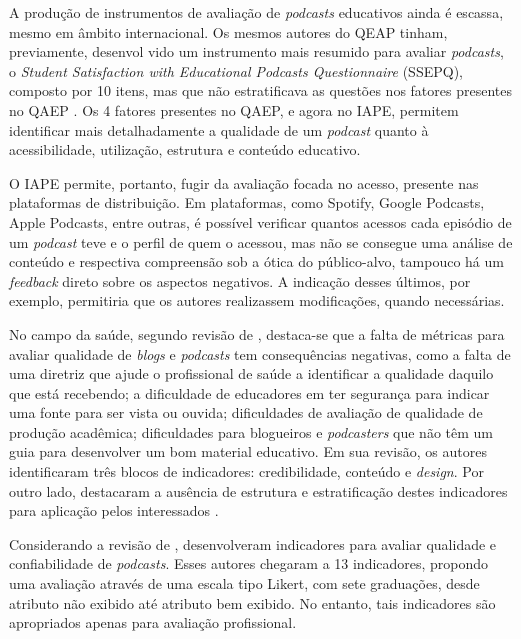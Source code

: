 A produção de instrumentos de avaliação de \textit{podcasts} educativos ainda é escassa, mesmo em âmbito internacional. Os mesmos autores do QEAP \cite{alarcon2020} tinham, previamente, desenvol vido um instrumento mais resumido para avaliar \textit{podcasts}, o \textit{Student Satisfaction with Educational Podcasts Questionnaire} (SSEPQ), composto por 10 itens, mas que não estratificava as questões nos fatores presentes no QAEP \cite{alarcon2017}. Os 4 fatores presentes no QAEP, e agora no IAPE, permitem identificar mais detalhadamente a qualidade de um \textit{podcast} quanto à acessibilidade, utilização, estrutura e conteúdo educativo.

O IAPE permite, portanto, fugir da avaliação focada no acesso, presente nas
plataformas de distribuição. Em plataformas, como Spotify, Google Podcasts,
Apple Podcasts, entre outras, é possível verificar quantos acessos cada
episódio de um \textit{podcast} teve e o perfil de quem o acessou, mas não se
consegue uma análise de conteúdo e respectiva compreensão sob a ótica do
público-alvo, tampouco há um \textit{feedback} direto sobre os aspectos
negativos. A indicação desses últimos, por exemplo, permitiria que os autores
realizassem modificações, quando necessárias.

No campo da saúde, segundo revisão de \textcite{paterson2015}, destaca-se que a
falta de métricas para avaliar qualidade de \textit{blogs} e \textit{podcasts}
tem consequências negativas, como a falta de uma diretriz que ajude o
profissional de saúde a identificar a qualidade daquilo que está recebendo; a
dificuldade de educadores em ter segurança para indicar uma fonte para ser
vista ou ouvida; dificuldades de avaliação de qualidade de produção acadêmica;
dificuldades para blogueiros e \textit{podcasters} que não têm um guia para
desenvolver um bom material educativo. Em sua revisão, os autores identificaram
três blocos de indicadores: credibilidade, conteúdo e \textit{design}. Por
outro lado, destacaram a ausência de estrutura e estratificação destes
indicadores para aplicação pelos interessados \cite{paterson2015}.

Considerando a revisão de \textcite{paterson2015}, \textcite{chan2016}
desenvolveram indicadores para avaliar qualidade e confiabilidade de
\textit{podcasts}. Esses autores chegaram a 13 indicadores, propondo uma
avaliação através de uma escala tipo Likert, com sete graduações, desde
atributo não exibido até atributo bem exibido. No entanto, tais indicadores são
apropriados apenas para avaliação profissional.

